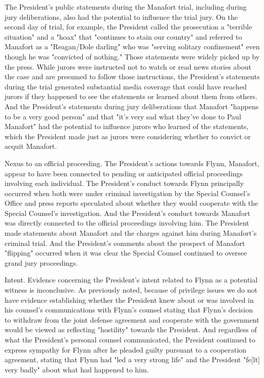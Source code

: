 The President's public statements during the Manafort trial, including during jury deliberations, also had the potential to influence the trial jury.
On the second day of trial, for example, the President called the prosecution a "terrible situation" and a "hoax" that "continues to stain our country" and referred to Manafort as a "Reagan/Dole darling" who was "serving solitary confinement" even though he was "convicted of nothing."
Those statements were widely picked up by the press.
While jurors were instructed not to watch or read news stories about the case and are presumed to follow those instructions, the President's statements during the trial generated substantial media coverage that could have reached jurors if they happened to see the statements or learned about them from others.
And the President's statements during jury deliberations that Manafort "happens to be a very good person" and that "it's very sad what they've done to Paul Manafort" had the potential to influence jurors who learned of the statements, which the President made just as jurors were considering whether to convict or acquit Manafort.


Nexus to an official proceeding.
The President's actions towards Flynn, Manafort, appear to have been connected to pending or anticipated official proceedings involving each individual.
The President's conduct towards Flynn principally occurred when both were under criminal investigation by the Special Counsel's Office and press reports speculated about whether they would cooperate with the Special Counsel's investigation.
And the President's conduct towards Manafort was directly connected to the official proceedings involving him.
The President made statements about Manafort and the charges against him during Manafort's criminal trial.
And the President's comments about the prospect of Manafort "flipping" occurred when it was clear the Special Counsel continued to oversee grand jury proceedings.

Intent.
Evidence concerning the President's intent related to Flynn as a potential witness is inconclusive.
As previously noted, because of privilege issues we do not have evidence establishing whether the President knew about or was involved in his counsel's communications with Flynn's counsel stating that Flynn's decision to withdraw from the joint defense agreement and cooperate with the government would be viewed as reflecting "hostility" towards the President.
And regardless of what the President's personal counsel communicated, the President continued to express sympathy for Flynn after he pleaded guilty pursuant to a cooperation agreement, stating that Flynn had "led a very strong life" and the President "fe[lt] very badly" about what had happened to him.

